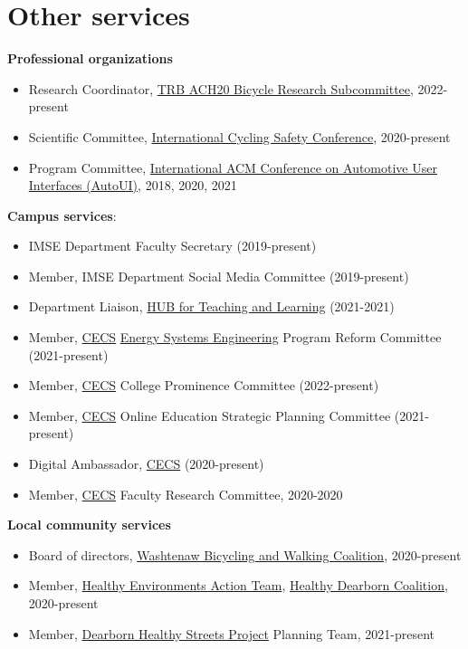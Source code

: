 \documentclass[11pt]{article}
\newenvironment{main}
{\begin{adjustwidth}{3em}{}}
{\end{adjustwidth}}
\begin{document}
\section*{Other services}
\begin{main}

\textbf{Professional organizations}
\begin{itemize}
    \item Research Coordinator, \href{https://sites.google.com/view/bikeresearch}{TRB ACH20 Bicycle Research Subcommittee}, 2022-present 
    \item Scientific Committee, \href{http://www.cyclingsafety.net}{International Cycling Safety Conference}, 2020-present
    \item Program Committee, \href{https://www.auto-ui.org/20/}{International ACM Conference on Automotive User Interfaces (AutoUI)}, 2018, 2020, 2021
\end{itemize}

\textbf{Campus services}: 
\begin{itemize}
    \item IMSE Department Faculty Secretary (2019-present)
    \item Member, IMSE Department Social Media Committee (2019-present)
    \item Department Liaison, \href{https://umdearborn.edu/faculty-staff/hub-teaching-learning-resources}{HUB for Teaching and Learning} (2021-2021)
    \item Member, \href{https://umdearborn.edu/cecs}{CECS} \href{https://umdearborn.edu/cecs/departments/electrical-and-computer-engineering/graduate-programs/mse-energy-systems-engineering}{Energy Systems Engineering} Program Reform Committee (2021-present)
    \item Member, \href{https://umdearborn.edu/cecs}{CECS} College Prominence Committee (2022-present)
    \item Member, \href{https://umdearborn.edu/cecs}{CECS} Online Education Strategic Planning Committee (2021-present)
    \item Digital Ambassador, \href{https://umdearborn.edu/cecs}{CECS} (2020-present)
    \item Member, \href{https://umdearborn.edu/cecs}{CECS} Faculty Research Committee, 2020-2020
\end{itemize}

\textbf{Local community services}
\begin{itemize}
    \item Board of directors, \href{https://www.wbwc.org/}{Washtenaw Bicycling and Walking Coalition}, 2020-present
    \item Member, \href{https://www.healthydearborn.org/healthy-environments}{Healthy Environments Action Team}, \href{https://www.healthydearborn.org/}{Healthy Dearborn Coalition}, 2020-present
    \item Member, \href{https://www.healthydearborn.org/dearbornhealthystreets}{Dearborn Healthy Streets Project} Planning Team, 2021-present
\end{itemize}



\end{main}
\end{document}
